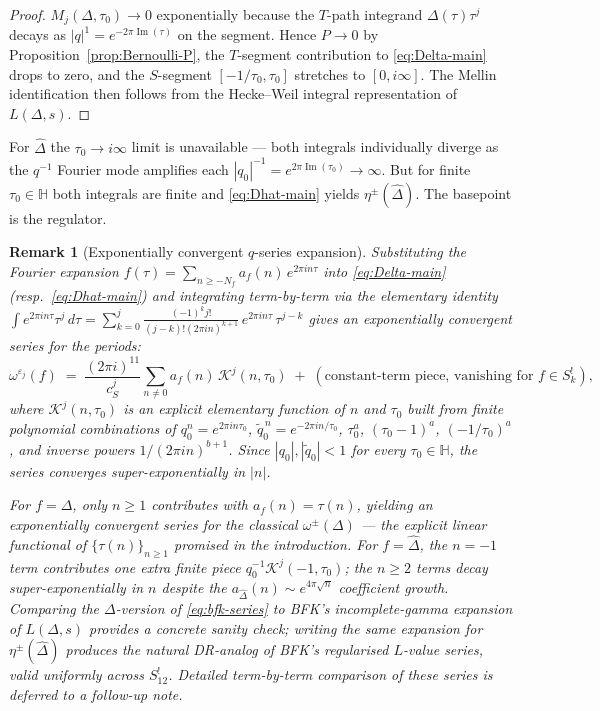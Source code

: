 \documentclass[11pt,letterpaper]{article}
\newtheorem{remark}[theorem]{Remark}
\newcommand{\HH}{\mathbb{H}}
\newcommand{\Dhat}{\widehat{\Delta}}
\newcommand{\eps}{\varepsilon}
\DeclareMathOperator{\im}{Im}
\begin{document}
\begin{proof}
$M_j(\Delta, \tau_0) \to 0$ exponentially because the $T$-path integrand
$\Delta(\tau)\tau^j$ decays as $|q|^1 = e^{-2\pi\im(\tau)}$ on the
segment.  Hence $P \to 0$ by Proposition~\ref{prop:Bernoulli-P}, the
$T$-segment contribution to \eqref{eq:Delta-main} drops to zero, and
the $S$-segment $[-1/\tau_0, \tau_0]$ stretches to $[0, i\infty]$.  The
Mellin identification then follows from the Hecke--Weil integral
representation of $L(\Delta, s)$.
\end{proof}

For $\Dhat$ the $\tau_0 \to i\infty$ limit is unavailable --- both
integrals individually diverge as the $q^{-1}$ Fourier mode amplifies
each $|q_0|^{-1} = e^{2\pi\im(\tau_0)} \to \infty$.  But for finite
$\tau_0 \in \HH$ both integrals are finite and \eqref{eq:Dhat-main}
yields $\eta^\pm(\Dhat)$.  The basepoint is the regulator.

\begin{remark}[Exponentially convergent $q$-series expansion]\label{rem:bfk-series}
Substituting the Fourier expansion
$f(\tau) = \sum_{n \ge -N_f}a_f(n)\,e^{2\pi i n\tau}$ into
\eqref{eq:Delta-main} (resp.\ \eqref{eq:Dhat-main}) and integrating
term-by-term via the elementary identity
\(
  \int e^{2\pi i n \tau}\tau^j\,d\tau =
  \sum_{k=0}^j \tfrac{(-1)^k j!}{(j-k)!(2\pi i n)^{k+1}}\,e^{2\pi i n\tau}\,\tau^{j-k}
\)
gives an exponentially convergent series for the periods:
\begin{equation}\label{eq:bfk-series}
  \omega^{\eps_j}(f) \;=\; \frac{(2\pi i)^{11}}{c_S^j}\sum_{n \ne 0}
                            a_f(n)\,\mathcal{K}^j(n,\tau_0)
  \;+\; (\text{constant-term piece, vanishing for } f \in S_k^!),
\end{equation}
where $\mathcal{K}^j(n, \tau_0)$ is an explicit elementary function of
$n$ and $\tau_0$ built from finite polynomial combinations of
$q_0^n = e^{2\pi i n\tau_0}$, $\widetilde q_0^{\,n} = e^{-2\pi i n/\tau_0}$,
$\tau_0^a$, $(\tau_0-1)^a$, $(-1/\tau_0)^a$, and inverse powers
$1/(2\pi i n)^{b+1}$.  Since $|q_0|, |\widetilde q_0| < 1$ for every
$\tau_0 \in \HH$, the series converges super-exponentially in $|n|$.

For $f = \Delta$, only $n \ge 1$ contributes with $a_f(n) = \tau(n)$,
yielding an exponentially convergent series for the classical
$\omega^\pm(\Delta)$ --- the explicit linear functional of
$\{\tau(n)\}_{n \ge 1}$ promised in the introduction.  For $f = \Dhat$,
the $n = -1$ term contributes one extra finite piece
$q_0^{-1}\mathcal{K}^j(-1, \tau_0)$; the $n \ge 2$ terms decay
super-exponentially in $n$ despite the
$a_{\Dhat}(n) \sim e^{4\pi\sqrt n}$ coefficient growth.  Comparing the
$\Delta$-version of \eqref{eq:bfk-series} to BFK's incomplete-gamma
expansion of $L(\Delta, s)$ \cite{BFK2011} provides a concrete sanity
check; writing the same expansion for $\eta^\pm(\Dhat)$ produces the
natural DR-analog of BFK's regularised $L$-value series, valid uniformly
across $S_{12}^!$.  Detailed term-by-term comparison of these series is
deferred to a follow-up note.
\end{remark}
\end{document}
